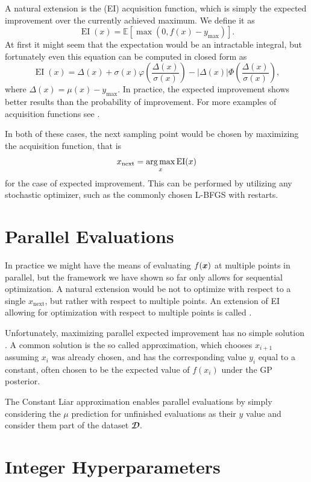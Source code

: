 A natural extension is the  (EI) acquisition function,
which is simply the expected improvement over the currently achieved maximum.
We define it as $$\operatorname{EI}(x) = 𝔼[\max(0, f(x) - y_{\max})].$$ At first it might seem that
the expectation would be an intractable integral, but fortunately even this
equation can be computed in closed form as
$$
\operatorname{EI}(x) = Δ(x) + σ(x) φ \left( \frac{Δ(x)}{σ(x)} \right) - |Δ(x)| Φ \left( \frac{Δ(x)}{σ(x)} \right),
$$
where $Δ(x) = μ(x) - y_{\max}$. In practice, the expected improvement shows better results
than the probability of improvement. For more examples of acquisition functions see
\cite{frazier2018tutorial}.

In both of these cases, the next sampling point would be chosen by maximizing
the acquisition function, that is $$x_{\operatorname{next}} = \operatorname*{arg\,max}_x \operatorname{EI}(x)$$ for
the case of expected improvement. This can be performed by utilizing any stochastic optimizer,
such as the commonly chosen L-BFGS with restarts.


\section{Parallel Evaluations}
\label{section:parallel-evaluations}

In practice we might have the means of evaluating $f({\boldsymbol{x}})$ at multiple points
in parallel, but the framework we have shown so far only allows for sequential
optimization. A natural extension would be not to optimize with respect
to a single $x_{\operatorname{next}}$, but rather with respect to multiple points. An extension
of EI allowing for optimization with respect to multiple points is called .

Unfortunately, maximizing parallel expected improvement has no simple solution \citep{frazier2018tutorial}. A
common solution is the so called  approximation, which
chooses $x_{i+1}$ assuming $x_i$ was already chosen, and has the corresponding
value $y_i$ equal to a constant, often chosen to be the expected value of
$f(x_i)$ under the GP posterior.

The Constant Liar approximation enables parallel evaluations by simply
considering the $μ$ prediction for unfinished evaluations as their $y$ value
and consider them part of the dataset $𝓓$.


\section{Integer Hyperparameters}
\label{section:integer-hyperparameters}

